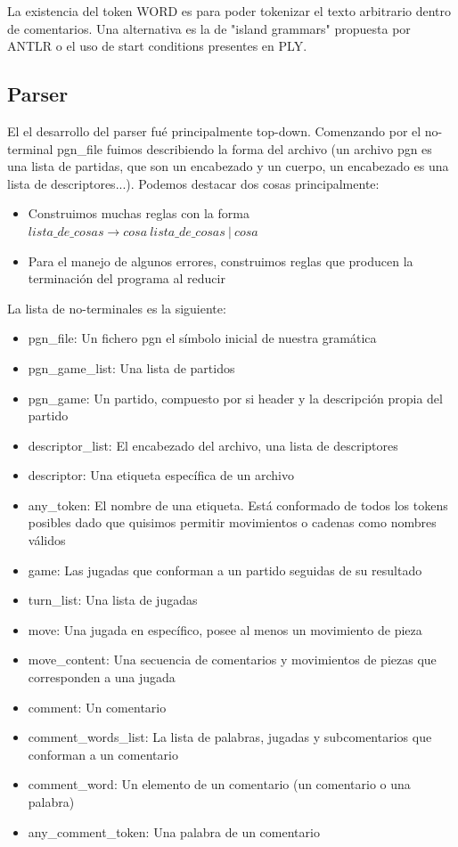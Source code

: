 La existencia del token WORD es para poder tokenizar el texto arbitrario dentro de comentarios. Una alternativa es la de "island grammars" propuesta por ANTLR o el uso de start conditions presentes en PLY.

\subsection{Parser}

El el desarrollo del parser fué principalmente top-down. Comenzando por el no-terminal pgn\_file fuimos describiendo la forma del archivo (un archivo pgn es una lista de partidas, que son un encabezado y un cuerpo, un encabezado es una lista de descriptores...).
Podemos destacar dos cosas principalmente:
\begin{itemize}
  \item{Construimos muchas reglas con la forma $lista\_de\_cosas \rightarrow cosa\ lista\_de\_cosas\ |\ cosa$}
  \item{Para el manejo de algunos errores, construimos reglas que producen la terminación del
programa al reducir}
\end{itemize}

La lista de no-terminales es la siguiente:

  \begin{itemize}
    \item pgn\_file: Un fichero pgn el símbolo inicial de nuestra gramática
    \item pgn\_game\_list: Una lista de partidos
    \item pgn\_game: Un partido, compuesto por si header y la descripción propia del partido
    \item descriptor\_list: El encabezado del archivo, una lista de descriptores
    \item descriptor: Una etiqueta específica de un archivo
    \item any\_token: El nombre de una etiqueta. Está conformado de todos los tokens posibles dado que quisimos permitir movimientos o cadenas como nombres válidos
    \item game: Las jugadas que conforman a un partido seguidas de su resultado
    \item turn\_list: Una lista de jugadas
    \item move: Una jugada en específico, posee al menos un movimiento de pieza
    \item move\_content: Una secuencia de comentarios y movimientos de piezas que corresponden a una jugada
    \item comment: Un comentario
    \item comment\_words\_list: La lista de palabras, jugadas y subcomentarios que conforman a un comentario
    \item comment\_word: Un elemento de un comentario (un comentario o una palabra)
    \item any\_comment\_token: Una palabra de un comentario
\end{itemize}

